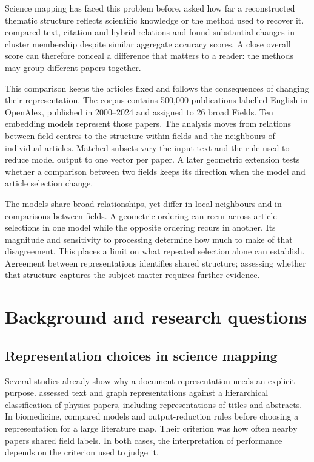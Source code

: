 \documentclass[12pt]{article}
\begin{document}
Science mapping has faced this problem before. \citet{refa0d2d707e6} asked how far a reconstructed thematic structure reflects scientific knowledge or the method used to recover it. \citet{ref6a2f5912bc} compared text, citation and hybrid relations and found substantial changes in cluster membership despite similar aggregate accuracy scores. A close overall score can therefore conceal a difference that matters to a reader: the methods may group different papers together.

This comparison keeps the articles fixed and follows the consequences of changing their representation. The corpus contains 500,000 publications labelled English in OpenAlex, published in 2000--2024 and assigned to 26 broad Fields. Ten embedding models represent those papers. The analysis moves from relations between field centres to the structure within fields and the neighbours of individual articles. Matched subsets vary the input text and the rule used to reduce model output to one vector per paper. A later geometric extension tests whether a comparison between two fields keeps its direction when the model and article selection change.

The models share broad relationships, yet differ in local neighbours and in comparisons between fields. A geometric ordering can recur across article selections in one model while the opposite ordering recurs in another. Its magnitude and sensitivity to processing determine how much to make of that disagreement. This places a limit on what repeated selection alone can establish. Agreement between representations identifies shared structure; assessing whether that structure captures the subject matter requires further evidence.

\section{Background and research questions}
\subsection{Representation choices in science mapping}
Several studies already show why a document representation needs an explicit purpose. \citet{refc0e2cc29e0} assessed text and graph representations against a hierarchical classification of physics papers, including representations of titles and abstracts. In biomedicine, \citet{refbe130e2973} compared models and output-reduction rules before choosing a representation for a large literature map. Their criterion was how often nearby papers shared field labels. In both cases, the interpretation of performance depends on the criterion used to judge it.
\end{document}
